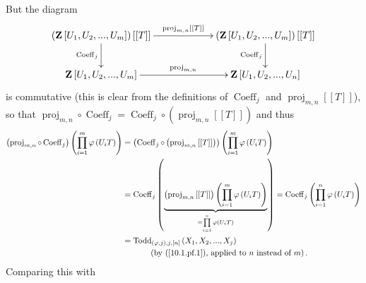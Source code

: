 \documentclass[numbers=enddot,12pt,final,onecolumn,notitlepage]{scrartcl}%
\begin{document}
But the diagram%
\[
\xymatrixcolsep{5pc}\xymatrix{
\left(\mathbf Z\left[U_1,U_2,...,U_m\right]\right)\left[\left[T\right]\right] \ar[r]^{\operatorname*{proj}_{m,n}\left[\left[T\right]\right]} \ar[d]_{\operatorname*{Coeff}_j} & \left(\mathbf Z\left[U_1,U_2,...,U_m\right]\right)\left[\left[T\right]\right]  \ar[d]_{\operatorname*{Coeff}_j} \\
\mathbf Z\left[U_1,U_2,...,U_m\right] \ar[r]^{\operatorname*{proj}_{m,n}} & \mathbf Z\left[U_1,U_2,...,U_n\right]
}
\]
is commutative (this is clear from the definitions of $\operatorname*{Coeff}%
\nolimits_{j}$ and $\operatorname*{proj}\nolimits_{m,n}\left[  \left[
T\right]  \right]  $), so that $\operatorname*{proj}\nolimits_{m,n}%
\circ\operatorname*{Coeff}\nolimits_{j}=\operatorname*{Coeff}\nolimits_{j}%
\circ\left(  \operatorname*{proj}\nolimits_{m,n}\left[  \left[  T\right]
\right]  \right)  $ and thus%
\begin{align*}
\left(  \operatorname*{proj}\nolimits_{m,n}\circ\operatorname*{Coeff}%
\nolimits_{j}\right)  \left(  \prod\limits_{i=1}^{m}\varphi\left(
U_{i}T\right)  \right)   &  =\left(  \operatorname*{Coeff}\nolimits_{j}%
\circ\left(  \operatorname*{proj}\nolimits_{m,n}\left[  \left[  T\right]
\right]  \right)  \right)  \left(  \prod\limits_{i=1}^{m}\varphi\left(
U_{i}T\right)  \right) \\
&  =\operatorname*{Coeff}\nolimits_{j}\left(  \underbrace{\left(
\operatorname*{proj}\nolimits_{m,n}\left[  \left[  T\right]  \right]  \right)
\left(  \prod\limits_{i=1}^{m}\varphi\left(  U_{i}T\right)  \right)  }%
_{=\prod\limits_{i=1}^{n}\varphi\left(  U_{i}T\right)  }\right)
=\operatorname*{Coeff}\nolimits_{j}\left(  \prod\limits_{i=1}^{n}%
\varphi\left(  U_{i}T\right)  \right) \\
&  =\operatorname*{Todd}\nolimits_{\left(  \varphi,j\right)  ,j,\left[
n\right]  }\left(  X_{1},X_{2},...,X_{j}\right) \\
&  \ \ \ \ \ \ \ \ \ \ \left(  \text{by (\ref{10.1.pf.1}), applied to }n\text{
instead of }m\right)  .
\end{align*}
Comparing this with%
\end{document}

